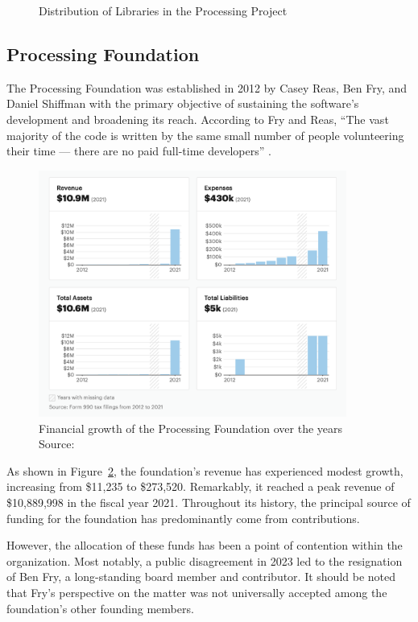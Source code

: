 \begin{figure}
	
	\caption{Distribution of Libraries in the Processing Project}
	\label{figure:libraries}
\end{figure}


\subsection{Processing Foundation}

The Processing Foundation was established in 2012 by Casey Reas, Ben Fry, and Daniel Shiffman with the primary objective of sustaining the software's development and broadening its reach. According to Fry and Reas, ``The vast majority of the code is written by the same small number of people volunteering their time — there are no paid full-time developers'' \parencite[p.~13]{fryModernPrometheusHistory2018}.

\begin{figure}[h]
	\centering
	\includegraphics[width=0.9\textwidth]{images/foundation-finances.png}
	\caption{Financial growth of the Processing Foundation over the years Source: \parencite{ProcessingFoundationNonprofit2013}}
	\label{fig:foundation-finances}
\end{figure}

As shown in Figure~\ref{fig:foundation-finances}, the foundation's revenue has experienced modest growth, increasing from \$11,235 to \$273,520. Remarkably, it reached a peak revenue of \$10,889,998 in the fiscal year 2021. Throughout its history, the principal source of funding for the foundation has predominantly come from contributions.

However, the allocation of these funds has been a point of contention within the organization. Most notably, a public disagreement in 2023 led to the resignation of Ben Fry, a long-standing board member and contributor. It should be noted that Fry's perspective on the matter was not universally accepted among the foundation's other founding members. \parencite{benfry[@ben_fry]HaveMadeExtremely2023} \parencite{caseyreas[@reas]EarlierThisWeek2023} \parencite{danielshiffman[@shiffman]WouldPostNote2023}

